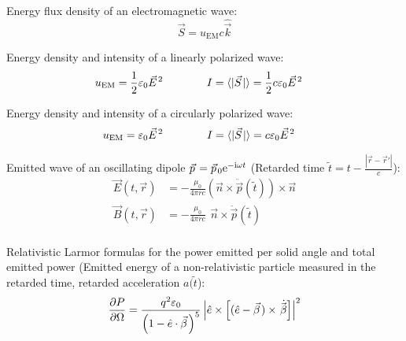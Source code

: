 			\noindent
			Energy flux density of an electromagnetic wave:
			\begin{equation}
				\vec{S} = u_{\text{EM}}c\hat{\vec{k}}
			\end{equation}

			\noindent
			Energy density and intensity of a linearly polarized wave:
			\begin{equation}
				\begin{aligned}
					u_{\text{EM}} &= \frac{1}{2}\varepsilon_0\vec{E}^2 &\hsp
					I &= \langle|\vec{S}|\rangle = \frac{1}{2}c\varepsilon_0\vec{E}^2
				\end{aligned}
			\end{equation}

			\noindent
			Energy density and intensity of a circularly polarized wave:
			\begin{equation}
				\begin{aligned}
					u_{\text{EM}} &= \varepsilon_0\vec{E}^2 &\hsp
					I &= \langle|\vec{S}|\rangle = c\varepsilon_0\vec{E}^2
				\end{aligned}
			\end{equation}

			\noindent
			Emitted wave of an oscillating dipole $\vec{p} = \vec{p}_0 \ex^{-\i\omega t}$ (Retarded time $\tilde{t} = t-\frac{\left|\vec{r}-\vec{r}'\right|}{c}$):
			\begin{equation}
				\begin{aligned}
					\vec{E}(t,\vec{r}) &= -\frac{\mu_0}{4\pi r c}	\left(\vec{n}\times\ddot{\vec{p}}(\tilde{t})\right) \times \vec{n} \\
					\vec{B}(t,\vec{r}) &= -\frac{\mu_0}{4\pi r c} \phantom{\Big(}\vec{n}\times\ddot{\vec{p}}(\tilde{t}) \\
				\end{aligned}
			\end{equation}

			\noindent
			Relativistic Larmor formulas for the power emitted per solid angle and total emitted power (Emitted energy of a non-relativistic particle measured in the retarded time, retarded acceleration $a(\tilde{t}$):
			\begin{equation}
				\begin{aligned}
					\pdv{P}{\Omega} &= \frac{q^2 \varepsilon_0}{\qty(1-\hat{e}\cdot\vec{\beta})^5} \left| \hat{e}\times\qty[(\hat{e}-\vec{\beta}) \times \dot{\vec{\beta}}] \right|^2 \\
				\end{aligned}
			\end{equation}

